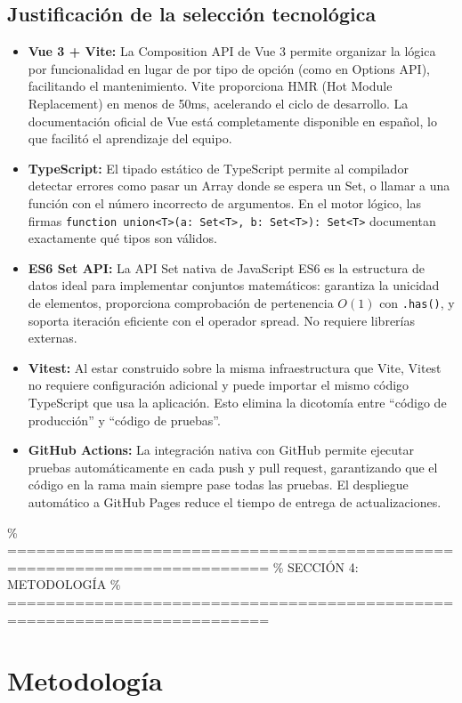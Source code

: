\documentclass[11pt,a4paper]{article}
\begin{document}
\subsection{Justificación de la selección tecnológica}
\begin{itemize}
    \item \textbf{Vue 3 + Vite:} La Composition API de Vue 3 permite organizar la lógica por funcionalidad en lugar de por tipo de opción (como en Options API), facilitando el mantenimiento. Vite proporciona HMR (Hot Module Replacement) en menos de 50ms, acelerando el ciclo de desarrollo. La documentación oficial de Vue está completamente disponible en español, lo que facilitó el aprendizaje del equipo.
    \item \textbf{TypeScript:} El tipado estático de TypeScript permite al compilador detectar errores como pasar un Array donde se espera un Set, o llamar a una función con el número incorrecto de argumentos. En el motor lógico, las firmas \texttt{function union<T>(a: Set<T>, b: Set<T>): Set<T>} documentan exactamente qué tipos son válidos.
    \item \textbf{ES6 Set API:} La API Set nativa de JavaScript ES6 es la estructura de datos ideal para implementar conjuntos matemáticos: garantiza la unicidad de elementos, proporciona comprobación de pertenencia $O(1)$ con \texttt{.has()}, y soporta iteración eficiente con el operador spread. No requiere librerías externas.
    \item \textbf{Vitest:} Al estar construido sobre la misma infraestructura que Vite, Vitest no requiere configuración adicional y puede importar el mismo código TypeScript que usa la aplicación. Esto elimina la dicotomía entre ``código de producción'' y ``código de pruebas''.
    \item \textbf{GitHub Actions:} La integración nativa con GitHub permite ejecutar pruebas automáticamente en cada push y pull request, garantizando que el código en la rama main siempre pase todas las pruebas. El despliegue automático a GitHub Pages reduce el tiempo de entrega de actualizaciones.
\end{itemize}

\newpage

\% =========================================================================
\% SECCIÓN 4: METODOLOGÍA
\% =========================================================================
\section{Metodología}
\end{document}

